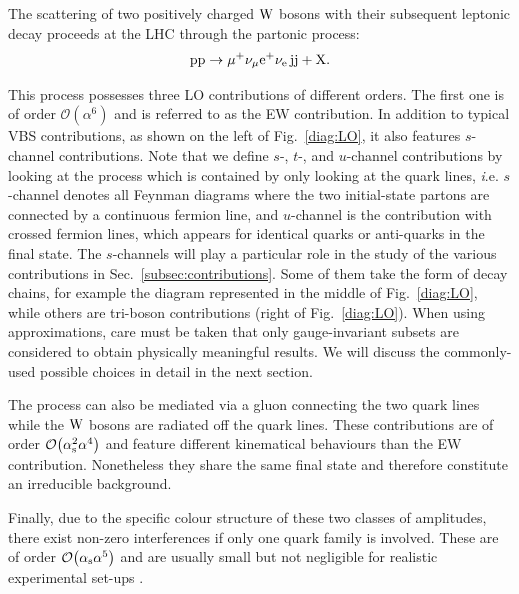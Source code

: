 The scattering of two positively charged $\text{W}$ bosons with their subsequent leptonic decay proceeds at the LHC through the partonic process:
%
\begin{equation}
\text{p}\text{p}\to\mu^+\nu_\mu{\rm e}^+\nu_{\rm e}\,\text{j}\text{j}+\mathrm{X}.
\end{equation}

This process possesses three LO contributions of different orders.
The first one is of order $\mathcal{O}{\left(\alpha^{6}\right)}$ and is referred to as the EW contribution.
In addition to typical VBS contributions, as shown on the left of Fig.~\ref{diag:LO}, it also features $s$-channel contributions.
Note that we define $s$-, $t$-, and $u$-channel contributions by looking at the process which is contained by only looking at the quark lines, {\emph i.e.} $s$-channel denotes all Feynman diagrams where the two initial-state partons are connected by a continuous fermion line, and $u$-channel is the contribution with crossed fermion lines, which appears for identical quarks or anti-quarks in the final state.
The $s$-channels will play a particular role in the study of the various contributions in Sec.~\ref{subsec:contributions}.
Some of them take the form of decay chains, for example the diagram represented in the middle of Fig.~\ref{diag:LO}, while others are tri-boson contributions (right of Fig.~\ref{diag:LO}).
When using approximations, care must be taken that only gauge-invariant subsets are considered to obtain physically meaningful results. We will discuss the commonly-used possible choices in detail in the next section.

The process can also be mediated via a gluon connecting the two quark lines while the $\text{W}$ bosons are radiated off the quark lines.
These contributions are of order $\mathcal{O}{\left(\alpha_\text{s}^{2}\alpha^{4}\right)}$ and feature different kinematical behaviours than the EW contribution.
Nonetheless they share the same final state and therefore constitute an irreducible background.

Finally, due to the specific colour structure of these two classes of amplitudes, there exist non-zero interferences if only one quark family is involved.
These are of order $\mathcal{O}{\left(\alpha_{\rm s}\alpha^{5}\right)}$ and are usually small but not negligible for realistic experimental set-ups \cite{Biedermann:2017bss}.


